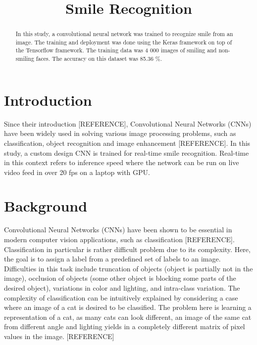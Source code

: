\documentclass{article}
\title{Smile Recognition}
\begin{document}
\maketitle
\sloppy

\begin{abstract}
In this study, a convolutional neural network was trained to recognize
smile from an image. The training and deployment was done using the
Keras framework on top of the Tensorflow framework. The training data
was 4 000 images of smiling and non-smiling faces. The accuracy on
this dataset was 85.36 \%.
\end{abstract}

\section{Introduction}\label{sec:intro}
Since their introduction [REFERENCE], Convolutional Neural Networks
(CNNs) have been widely used in solving various image processing
problems, such as classification, object recognition and image
enhancement [REFERENCE]. In this study, a custom design CNN is trained
for real-time smile recognition. Real-time in this context refers to
inference speed where the network can be run on live video feed in
over 20 fps on a laptop with GPU\@.

\section{Background}\label{sec:background}
Convolutional Neural Networks (CNNs) have been shown to be essential in
modern computer vision applications, such as classification
[REFERENCE]. Classification in particular is rather difficult problem
due to its complexity. Here, the goal is to assign a label from a
predefined set of labels to an image. Difficulties in this task
include truncation of objects (object is partially not in the image),
occlusion of objects (some other object is blocking some parts of
the desired object), variations in color and lighting, and intra-class
variation. The complexity of classification can be intuitively
explained by considering a case where an image of a cat is desired to
be classified. The problem here is learning a representation of a cat,
as many cats can look different, an image of the same cat from
different angle and lighting yields in a completely different matrix
of pixel values in the image. [REFERENCE]
\end{document}
